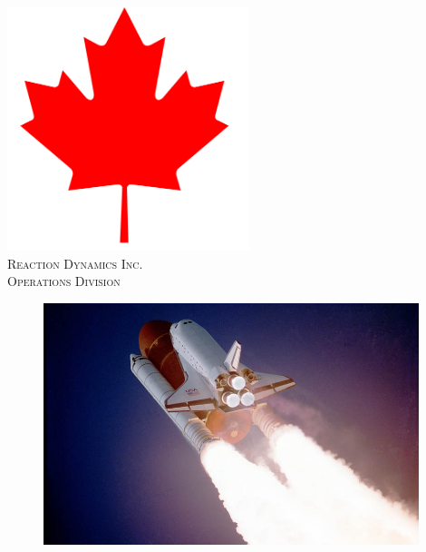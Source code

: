 
\begin{titlepage}

\newcommand{\HRule}{\rule{\linewidth}{0.5mm}} %

\center %
 

\includegraphics[width=200pt]{images/mapleleaf.png}\\[1cm] %
\textsc{\Large Reaction Dynamics Inc.}\\[0.5cm] %
\textsc{\large Operations Division}\\[0.5cm] %


\begin{figure}[ht]
    \centering
    \includegraphics[height=200pt]{images/nasa-rocket-launch-high-quality-24.jpg}\\
\end{figure}


\end{titlepage}
